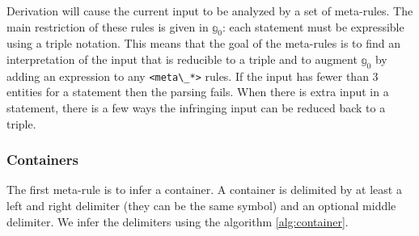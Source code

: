 \documentclass[11pt,a4paper,twoside,openright,titlepage,numbers=noenddot,headinclude,cleardoublepage=empty,openany]{scrreprt}
\theoremstyle{plain}
\theoremstyle{definition}
\theoremstyle{remark}
\newcommand{\algorithmicbreak}{\textbf{break}}
\newcommand{\Break}{\State \algorithmicbreak}\newcommand{\algorithmiccontinue}{\textbf{continue}}
\newcommand{\passthrough}[1]{#1}
\newcommand{\bb}{\mathbb}
\begin{document}
Derivation will cause the current input to be analyzed by a set of
meta-rules. The main restriction of these rules is given in
\(\bb{g}_0\): each statement must be expressible using a triple
notation. This means that the goal of the meta-rules is to find an
interpretation of the input that is reducible to a triple and to augment
\(\bb{g}_0\) by adding an expression to any
\passthrough{\lstinline!<meta\_*>!} rules. If the input has fewer than 3
entities for a statement then the parsing fails. When there is extra
input in a statement, there is a few ways the infringing input can be
reduced back to a triple.

\hypertarget{containers}{%
\subsubsection{Containers}\label{containers}}

The first meta-rule is to infer a container. A container is delimited by
at least a left and right delimiter (they can be the same symbol) and an
optional middle delimiter. We infer the delimiters using the
algorithm \ref{alg:container}.

\end{document}
